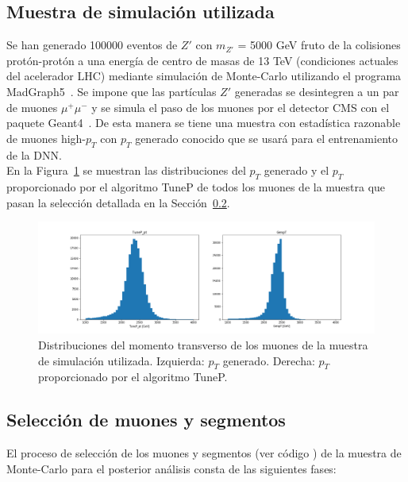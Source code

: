 \subsection{Muestra de simulaci\'on utilizada}\label{sec:sample}

Se han generado 100000 eventos de $Z'$ con $m_{Z'}$ = 5000 GeV fruto de la colisiones prot\'on-prot\'on a una energ\'ia de centro de masas de 13 TeV (condiciones actuales del acelerador LHC) mediante simulaci\'on de Monte-Carlo utilizando el programa MadGraph5~\cite{Alwall:2014hca}. Se impone que las part\'iculas $Z'$ generadas se desintegren a un par de muones $\mu^{+}\mu^{-}$ y se simula el paso de los muones por el detector CMS con el paquete Geant4~\cite{Agostinelli:2002hh}. De esta manera se tiene una muestra con estad\'istica razonable de muones high-$p_{T}$ con $p_{T}$ generado conocido que se usar\'a para el entrenamiento de la DNN. \\

En la Figura~\ref{fig:data_pt} se muestran las distribuciones del $p_{T}$ generado y el $p_{T}$ proporcionado por el algoritmo TuneP de todos los muones de la muestra que pasan la selecci\'on detallada en la Secci\'on~\ref{sec:selection}.

\begin{figure}[h]
\centering
\includegraphics[width=1.0\textwidth]{figures/data_pt.png}
\caption{Distribuciones del momento transverso de los muones de la muestra de simulaci\'on utilizada. Izquierda: $p_{T}$ generado. Derecha: $p_{T}$ proporcionado por el algoritmo TuneP.}
\label{fig:data_pt}        
\end{figure}


\subsection{Selecci\'on de muones y segmentos}\label{sec:selection}

El proceso de selecci\'on de los muones y segmentos (ver c\'odigo \cite{analyzer}) de la muestra de Monte-Carlo para el posterior an\'alisis consta de las siguientes fases: 

